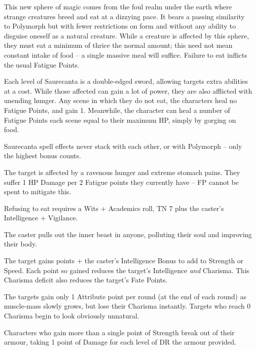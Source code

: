 \begin{multicols}{2}

\noindent
This new sphere of magic comes from the foul realm under the earth where strange creatures breed and eat at a dizzying pace.
It bears a passing similarity to Polymorph but with fewer restrictions on form and without any ability to disguise oneself as a natural creature.
While a creature is affected by this sphere, they must eat a minimum of thrice the normal amount; this need not mean constant intake of food -- a single massive meal will suffice.
Failure to eat inflicts the usual Fatigue Points.

Each level of Saurecanta is a double-edged sword, allowing targets extra abilities at a cost.
While those affected can gain a lot of power, they are also afflicted with unending hunger.
Any scene in which they do not eat, the characters heal no Fatigue Points, and gain 1.
Meanwhile, the character can heal a number of Fatigue Points each scene equal to their maximum HP, simply by gorging on food.

Saurecanta spell effects never stack with each other, or with Polymorph -- only the highest bonus counts.

\spelllevel \label{saurecantaone}
The target is affected by a ravenous hunger and extreme stomach pains.
They suffer 1 HP Damage per 2 Fatigue points they currently have -- FP cannot be spent to mitigate this.

Refusing to eat requires a Wits + Academics roll, TN 7 plus the caster's Intelligence + Vigilance.

\spelllevel
{}
The caster pulls out the inner beast in anyone, polluting their soul and improving their body.

The target gains  points + the caster's Intelligence Bonus to add to Strength or Speed.
Each point so gained reduces the target's Intelligence \emph{and} Charisma.
This Charisma deficit also reduces the target's Fate Points.

The targets gain only 1 Attribute point per round (at the end of each round) as muscle-mass slowly grows, but lose their Charisma instantly.
Targets who reach 0 Charisma begin to look obviously unnatural.

Characters who gain more than a single point of Strength break out of their armour, taking 1 point of Damage for each level of DR the armour provided.


\end{multicols}
